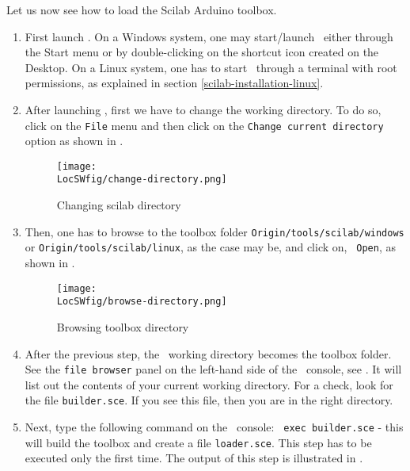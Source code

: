 Let us now see how to load the Scilab Arduino toolbox. 
\begin{enumerate}
      \item First launch \scilab. On a Windows system, one may start/launch
            \scilab\ either through the Start menu or by double-clicking on the
            shortcut icon created on the Desktop. On a Linux system, one has to
            start \scilab\ through a terminal with root permissions, as
            explained in section \ref{scilab-installation-linux}.
      \item After launching \scilab, first we have to change the working
            directory. To do so, click on the {\tt File} menu and then click on
            the {\tt Change current directory} option as shown in
            .
            \begin{figure}
                  \centering
                  \texttt{[image: \\LocSWfig/change-directory.png]}
                  \caption{Changing scilab directory}
                  \label{scilab-cd}
            \end{figure}
      \item Then, one has to browse to the toolbox folder
                  {\tt Origin/tools/scilab/windows} or {\tt Origin/tools/scilab/linux}, as the case
            may be, and click on, {\tt
                        Open}, as shown in .
            \begin{figure}
                  \centering
                  \texttt{[image: \\LocSWfig/browse-directory.png]}
                  \caption{Browsing toolbox directory}
                  \label{scilab-browse}
            \end{figure}
      \item After the previous step, the \scilab\ working directory becomes
            the toolbox folder.  See the {\tt file browser} panel on the
            left-hand side of the \scilab\ console, see .  It
            will list out the contents of your current working directory. For a
            check, look for the file {\tt builder.sce}.  If you see this file,
            then you are in the right directory.
      \item Next, type the following command on the \scilab\ console: {\tt
            exec builder.sce} - this will build the toolbox and create a file
                  {\tt loader.sce}. This step has to be executed only the first
            time. The output of this step is illustrated in .

\end{enumerate}
